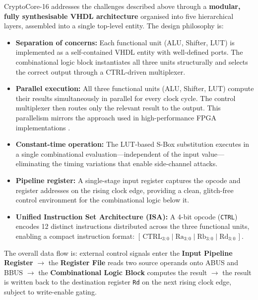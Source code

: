 \documentclass[12pt, a4paper]{report}
\begin{document}
CryptoCore-16 addresses the challenges described above through a \textbf{modular,
fully synthesisable VHDL architecture} organised into five hierarchical layers,
assembled into a single top-level entity. The design philosophy is:

\begin{itemize}
  \item \textbf{Separation of concerns:} Each functional unit (ALU, Shifter, LUT) is
        implemented as a self-contained VHDL entity with well-defined ports.
        The combinational logic block instantiates all three units structurally and
        selects the correct output through a CTRL-driven multiplexer.

  \item \textbf{Parallel execution:} All three functional units (ALU, Shifter, LUT)
        compute their results simultaneously in parallel for every clock cycle.
        The control multiplexer then routes only the relevant result to the output.
        This parallelism mirrors the approach used in high-performance FPGA
        implementations \cite{nassim2025fpga}.

  \item \textbf{Constant-time operation:} The LUT-based S-Box substitution executes in a
        single combinational evaluation—independent of the input value—eliminating the
        timing variations that enable side-channel attacks.

  \item \textbf{Pipeline register:} A single-stage input register captures the opcode
        and register addresses on the rising clock edge, providing a clean, glitch-free
        control environment for the combinational logic below it.

  \item \textbf{Unified Instruction Set Architecture (ISA):} A 4-bit opcode (\texttt{CTRL})
        encodes 12 distinct instructions distributed across the three functional units,
        enabling a compact instruction format: $[\,\text{CTRL}_{3:0}\;|\;\text{Ra}_{3:0}\;|\;\text{Rb}_{3:0}\;|\;\text{Rd}_{3:0}\,]$.
\end{itemize}

The overall data flow is: external control signals enter the \textbf{Input Pipeline Register}
$\rightarrow$ the \textbf{Register File} reads two source operands onto ABUS and BBUS
$\rightarrow$ the \textbf{Combinational Logic Block} computes the result
$\rightarrow$ the result is written back to the destination register \texttt{Rd}
on the next rising clock edge, subject to write-enable gating.
\end{document}
